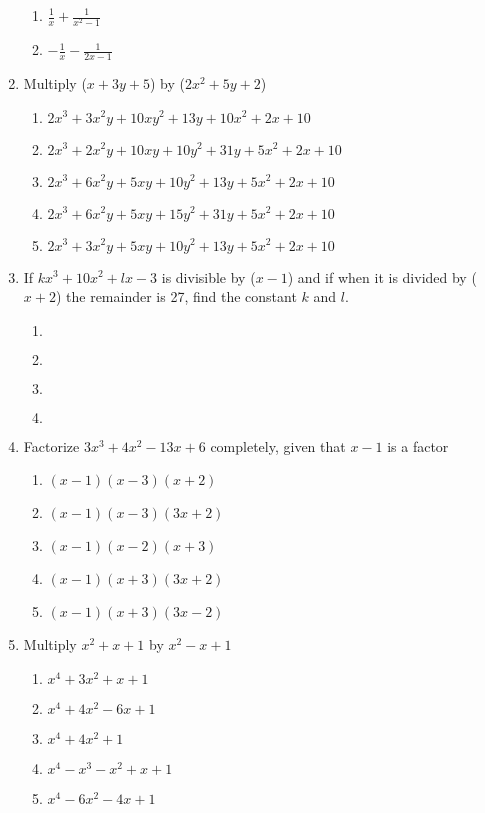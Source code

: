 \begin{multicols}{2}
\begin{enumerate}[label={\arabic*.}]
\begin{enumerate}[label={\Alph*.}]
	\item \(\frac{1}{x} + \frac{1}{x^2 - 1}\)
	\item \(-\frac{1}{x} - \frac{1}{2x - 1}\)
	\end{enumerate}
\item Multiply (\(x + 3y + 5\)) by (\(2x^2 + 5y + 2\))
	\begin{enumerate}[label={\Alph*.}]
	\item \(2x^3 + 3x^2y + 10xy^2 + 13y + 10x^2 + 2x + 10\)
	\item \(2x^3 + 2x^2y + 10xy + 10y^2 +  31y + 5x^2 + 2x + 10\)
	\item \(2x^3 + 6x^2y + 5xy + 10y^2 + 13y + 5x^2 + 2x + 10\)
	\item \(2x^3 + 6x^2y + 5xy + 15y^2 + 31y + 5x^2 + 2x + 10\)
	\item \(2x^3 + 3x^2y + 5xy + 10y^2 + 13y + 5x^2 + 2x + 10\)
	\end{enumerate}
\item If \(kx^3 + 	10x^2 + lx - 3\) is divisible by (\(x - 1\)) and if when it is divided by (\(x + 2\)) the remainder is 27,
find the constant \(k\) and \(l\).
	\begin{enumerate}[label={\Alph*.}]
	\item \(\)
	\item \(\)
	\item \(\)
	\item \(\)
	\end{enumerate}
\item Factorize \(3x^3 + 4x^2 - 13x + 6\) completely, given that \(x - 1\) is a factor
	\begin{enumerate}[label={\Alph*.}]
	\item \((x-1)(x-3)(x+2)\)
	\item \((x-1)(x-3)(3x+2)\)
	\item \((x-1)(x-2)(x+3)\)
	\item \((x-1)(x+3)(3x+2)\)
	\item \((x-1)(x+3)(3x-2)\)
	\end{enumerate}
\item Multiply \(x^2+x+1\) by \(x^2-x+1\)
	\begin{enumerate}[label={\Alph*.}]
	\item \(x^4+3x^2+x+1\)
	\item \(x^4+4x^2-6x+1\)
	\item \(x^4+4x^2+1\)
	\item \(x^4-x^3-x^2+x+1\)
	\item \(x^4-6x^2-4x+1\)
	\end{enumerate}

\end{enumerate}
\end{multicols}
